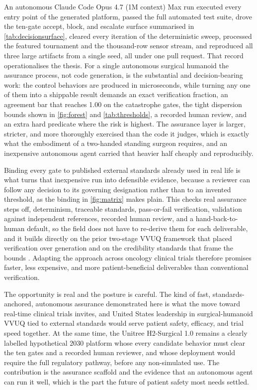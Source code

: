 
An autonomous Claude Code Opus 4.7 (1M context) Max run executed every entry
point of the generated platform, passed the full automated test suite, drove the
ten-gate accept, block, and escalate surface summarised in
\autoref{tab:decisionsurface}, cleared every iteration of the deterministic
sweep, processed the featured tournament and the thousand-row sensor stream, and
reproduced all three large artifacts from a single seed, all under one pull
request. That record operationalises the thesis. For a single autonomous surgical
humanoid the assurance process, not code generation, is the substantial and
decision-bearing work: the control behaviors are produced in microseconds, while
turning any one of them into a shippable result demands an exact verification
fraction, an agreement bar that reaches 1.00 on the catastrophe gates, the tight
dispersion bounds shown in \autoref{fig:forest} and \autoref{tab:thresholds}, a
recorded human review, and an extra hard predicate where the risk is highest. The
assurance layer is larger, stricter, and more thoroughly exercised than the code
it judges, which is exactly what the embodiment of a two-handed standing surgeon
requires, and an inexpensive autonomous agent carried that heavier half cheaply
and reproducibly.

Binding every gate to published external standards already used in real life is
what turns that inexpensive run into defensible evidence, because a reviewer can
follow any decision to its governing designation rather than to an invented
threshold, as the binding in \autoref{fig:matrix} makes plain. This checks real
assurance steps off, determinism, traceable standards, pass-or-fail verification,
validation against independent references, recorded human review, and a
hand-back-to-human default, so the field does not have to re-derive them for each
deliverable, and it builds directly on the prior two-stage VVUQ framework that
placed verification over generation \cite{kawchak2026vvuq01} and on the
credibility standards that frame the bounds \cite{asmevv40, nasastd7009a}.
Adapting the approach across oncology clinical trials therefore promises faster,
less expensive, and more patient-beneficial deliverables than conventional
verification.

The opportunity is real and the posture is careful. The kind of fast,
standards-anchored, autonomous assurance demonstrated here is what the move toward
real-time clinical trials invites, and United States leadership in
surgical-humanoid VVUQ tied to external standards would serve patient safety,
efficacy, and trial speed together. At the same time, the Unitree H2-Surgical 1.0
remains a clearly labelled hypothetical 2030 platform whose every candidate
behavior must clear the ten gates and a recorded human reviewer, and whose
deployment would require the full regulatory pathway, before any non-simulated
use. The contribution is the assurance scaffold and the evidence that an
autonomous agent can run it well, which is the part the future of patient safety
most needs settled.
